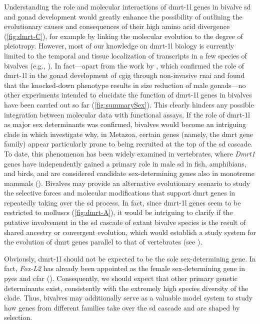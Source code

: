 Understanding the role and molecular interactions of \gls{dmrt-1l} genes in bivalve \gls{sd} and gonad development would greatly enhance the possibility of outlining the evolutionary causes and consequences of their high amino acid divergence (\cref{fig:dmrt-C}), for example by linking the molecular evolution to the degree of pleiotropy. However, most of our knowledge on \gls{dmrt-1l} biology is currently limited to the temporal and tissue localization of transcripts in a few species of bivalves (e.g., ). In fact---apart from the work by , which confirmed the role of \gls{dmrt-1l} in the gonad development of \gls{cgig} through non-invasive \gls{rnai} and found that the knocked-down phenotype results in size reduction of male gonads—no other experiments intended to elucidate the function of \gls{dmrt-1l} genes in bivalves have been carried out so far (\cref{fig:summarySex}). This clearly hinders any possible integration between molecular data with functional assays.
If the role of \gls{dmrt-1l} as major sex determinants was confirmed, bivalves would become an intriguing clade in which investigate why, in Metazoa, certain genes (namely, the \gls{dmrt} gene family) appear particularly prone to being recruited at the top of the \gls{sd} cascade. To date, this phenomenon has been widely examined in vertebrates, where \textit{Dmrt1} genes have independently gained a primary role in male \gls{sd} in fish, amphibians, and birds, and are considered candidate sex-determining genes also in monotreme mammals (). Bivalves may provide an alternative evolutionary scenario to study the selective forces and molecular modifications that support \gls{dmrt} genes in repeatedly taking over the \gls{sd} process. In fact, since \gls{dmrt-1l} genes seem to be restricted to molluscs (\cref{fig:dmrt-A}), it would be intriguing to clarify if the putative involvement in the \gls{sd} cascade of extant bivalve species is the result of shared ancestry or convergent evolution, which would establish a study system for the evolution of \gls{dmrt} genes parallel to that of vertebrates (see ).

Obviously, \gls{dmrt-1l} should not be expected to be the sole sex-determining gene. In fact, \textit{Fox-L2} has already been appointed as the female sex-determining gene in \gls{pyes} and \gls{cfar} (). Consequently, we should expect that other primary genetic determinants exist, consistently with the extremely high species diversity of the clade. Thus, bivalves may additionally serve as a valuable model system to study how genes from different families take over the \gls{sd} cascade and are shaped by selection.

